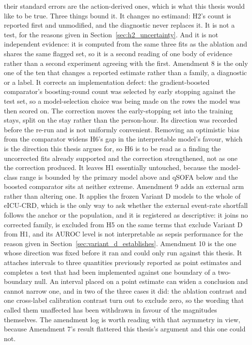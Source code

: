 \begin{enumerate}
    their standard errors are the action-derived ones, which is what this thesis
    would like to be true. Three things bound it. It changes no estimand: H2's
    count is reported first and unmodified, and the diagnostic never replaces
    it. It is not a test, for the reasons given in
    Section~\ref{sec:h2_uncertainty}. And it is not independent evidence: it is
    computed from the same three fits as the ablation and shares the same
    flagged set, so it is a second reading of one body of evidence rather than a
    second experiment agreeing with the first.
    Amendment 8 is the only one of the ten that changes a reported estimate
    rather than a family, a diagnostic or a label. It corrects an
    implementation defect: the gradient-boosted comparator's boosting-round
    count was selected by early stopping against the test set, so a
    model-selection choice was being made on the rows the model was then scored
    on. The correction moves the early-stopping set into the training stays,
    split on the stay rather than the person-hour. Its direction was recorded
    before the re-run and is not uniformly convenient. Removing an optimistic
    bias from the comparator widens H6's gap in the interpretable model's
    favour, which is the direction this thesis argues for, so H6 is to be read
    as a finding the uncorrected fits already supported and the correction
    strengthened, not as one the correction produced. It leaves H1 essentially
    untouched, because the model-class range is bounded by the primary model
    above and qSOFA below and the boosted comparator sits at neither extreme.
    Amendment 9 adds an external arm rather than altering one. It applies the
    frozen Variant D models to the whole of eICU-CRD, which is the only way to
    ask whether the external event-rate shortfall follows the anchor or the
    population, and it is registered as descriptive: it joins no corrected
    family, is excluded from H5 on the same terms that exclude Variant D from
    H1, and its AUROC level is not interpretable as sepsis performance for the
    reason given in Section~\ref{sec:variant_d_establishes}.
    Amendment 10 is the one whose direction was fixed before it ran and could
    only run against this thesis. It attaches intervals to three quantities
    previously reported as point estimates and completes a test that had been
    implemented against one boundary of a two-boundary null. An interval placed
    on a point estimate can widen a conclusion and cannot narrow one, and in
    two of the three cases it did: the ablation contrast and one cross-label
    calibration contrast turn out to exclude zero, so the wording that called
    them unaffected has been withdrawn in favour of the magnitudes themselves.
    The amendment log is worth reading with that asymmetry in view, because
    Amendment 7's result flattered this thesis's argument and this one could
    not.


\end{enumerate}
